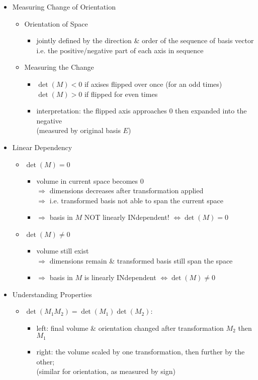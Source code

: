 \begin{itemize}
\item Measuring Change of Orientation
	\begin{itemize}
	\item Orientation of Space
		\begin{itemize}
		\item jointly defined by the direction \& order of the sequence of basis vector \\
		i.e. the positive/negative part of each axis in sequence
		\end{itemize}
	\item Measuring the Change
		\begin{itemize}
		\item $\det(M) < 0$ if axises flipped over once (for an odd times) \\
		$\det(M) > 0$ if flipped for even times
		\item interpretation: the flipped axis approaches $0$ then expanded into the negative \\
		(measured by original basis $E$)
		\end{itemize}
	\end{itemize}
	
\item Linear Dependency
	\begin{itemize}
	\item $\det(M) = 0$
		\begin{itemize}
		\item volume in current space becomes 0 \\
		$\Rightarrow$ dimensions decreases after transformation applied \\
		$\Rightarrow$ i.e. transformed basis not able to span the current space
		\item $\Rightarrow$ basis in $M$ NOT linearly INdependent! $\Leftrightarrow \det(M)=0$
		\end{itemize}
	\item $\det(M) \neq 0$
		\begin{itemize}
		\item volume still exist \\
		$\Rightarrow$ dimensions remain \& transformed basis still span the space
		\item $\Rightarrow$ basis in $M$ is linearly INdependent $\Leftrightarrow \det(M) \neq 0$
		\end{itemize}
	\end{itemize}

\item Understanding Properties
	\begin{itemize}
	\item $\det(M_1M_2) = \det(M_1)\det(M_2)$:
		\begin{itemize}
		\item left: final volume \& orientation changed after transformation $M_2$ then $M_1$
		\item right: the volume scaled by one transformation, then further by the other; \\ 
		(similar for orientation, as measured by sign)
		\end{itemize}
	\end{itemize}
\end{itemize}

